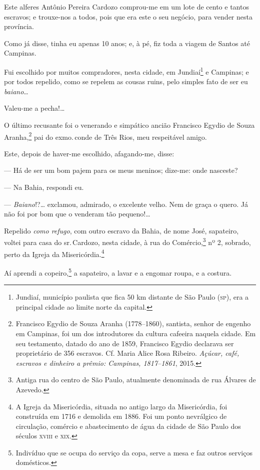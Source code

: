 Este alferes Antônio Pereira Cardozo comprou-me em um lote de cento e
tantos escravos; e trouxe-nos a todos, pois que era este o seu negócio,
para vender nesta província.

Como já disse, tinha eu apenas 10 anos; e, à pé, fiz toda a viagem de
Santos até Campinas.

Fui escolhido por muitos compradores, nesta cidade, em Jundiaí\footnote{
  Jundiaí, município paulista que fica 50 km distante de São Paulo (\textsc{sp}),
  era a principal cidade ao limite norte da capital.} e Campinas; e por
todos repelido, como se repelem as cousas ruins, pelo simples fato de
ser eu \emph{baiano}\ldots{}

Valeu-me a pecha!\ldots{}

O último recusante foi o venerando e simpático ancião Francisco Egydio
de Souza Aranha,\footnote{Francisco Egydio de Souza Aranha (1778--1860), \label{egydio}
  santista, senhor de engenho em Campinas, foi um dos introdutores
  da cultura cafeeira naquela cidade. Em seu testamento, datado do ano
  de 1859, Francisco Egydio declarava ser proprietário de 356 escravos.
  Cf. Maria Alice Rosa Ribeiro. \emph{Açúcar, café, escravos e dinheiro
  a prêmio: Campinas, 1817--1861}, 2015.} pai do exmo.\,conde de Três Rios, meu
respeitável amigo.

Este, depois de haver-me escolhido, afagando-me, disse:

--- Há de ser um bom pajem para os meus meninos; dize-me: onde
nasceste?

--- Na Bahia, respondi eu.

--- \emph{Baiano}!?\ldots{} exclamou, admirado, o excelente velho. Nem de
graça o quero. Já não foi por bom que o venderam tão pequeno!\ldots{}

Repelido \emph{como refugo}, com outro escravo da Bahia, de nome José,
sapateiro, voltei para casa do sr.\,Cardozo, nesta cidade, à rua do
Comércio,\footnote{Antiga rua do centro de São Paulo, atualmente
  denominada de rua Álvares de Azevedo.} nº 2, sobrado, perto da Igreja
da Misericórdia.\footnote{A Igreja da Misericórdia, situada no antigo
  largo da Misericórdia, foi construída em 1716 e demolida em 1886. Foi
  um ponto nevrálgico de circulação, comércio e abastecimento de água da
  cidade de São Paulo dos séculos \textsc{xviii} e \textsc{xix}.}

Aí aprendi a copeiro,\footnote{Indivíduo que se ocupa do serviço da
  copa, serve a mesa e faz outros serviços domésticos.} a sapateiro, a
lavar e a engomar roupa, e a costura.

